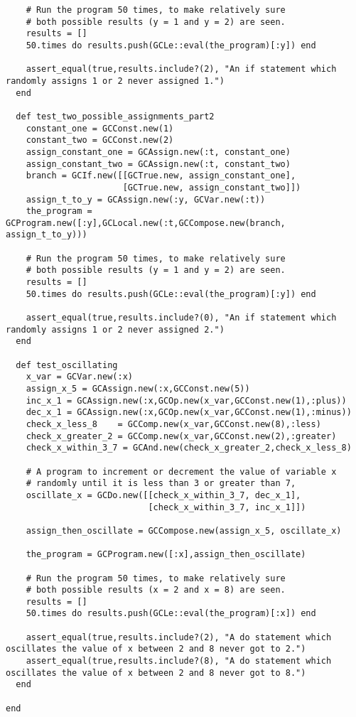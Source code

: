 \documentclass[11pt]{article}
\theoremstyle{definition}
\begin{document}
\begin{verbatim}
    # Run the program 50 times, to make relatively sure
    # both possible results (y = 1 and y = 2) are seen.
    results = []
    50.times do results.push(GCLe::eval(the_program)[:y]) end
  
    assert_equal(true,results.include?(2), "An if statement which randomly assigns 1 or 2 never assigned 1.")
  end

  def test_two_possible_assignments_part2
    constant_one = GCConst.new(1)
    constant_two = GCConst.new(2)
    assign_constant_one = GCAssign.new(:t, constant_one)
    assign_constant_two = GCAssign.new(:t, constant_two)
    branch = GCIf.new([[GCTrue.new, assign_constant_one],
                       [GCTrue.new, assign_constant_two]])
    assign_t_to_y = GCAssign.new(:y, GCVar.new(:t))
    the_program = GCProgram.new([:y],GCLocal.new(:t,GCCompose.new(branch, assign_t_to_y)))

    # Run the program 50 times, to make relatively sure
    # both possible results (y = 1 and y = 2) are seen.
    results = []
    50.times do results.push(GCLe::eval(the_program)[:y]) end
  
    assert_equal(true,results.include?(0), "An if statement which randomly assigns 1 or 2 never assigned 2.")
  end
  
  def test_oscillating
    x_var = GCVar.new(:x)
    assign_x_5 = GCAssign.new(:x,GCConst.new(5))
    inc_x_1 = GCAssign.new(:x,GCOp.new(x_var,GCConst.new(1),:plus))
    dec_x_1 = GCAssign.new(:x,GCOp.new(x_var,GCConst.new(1),:minus))
    check_x_less_8    = GCComp.new(x_var,GCConst.new(8),:less)
    check_x_greater_2 = GCComp.new(x_var,GCConst.new(2),:greater)
    check_x_within_3_7 = GCAnd.new(check_x_greater_2,check_x_less_8)
    
    # A program to increment or decrement the value of variable x
    # randomly until it is less than 3 or greater than 7,
    oscillate_x = GCDo.new([[check_x_within_3_7, dec_x_1],
                            [check_x_within_3_7, inc_x_1]])

    assign_then_oscillate = GCCompose.new(assign_x_5, oscillate_x)

    the_program = GCProgram.new([:x],assign_then_oscillate)

    # Run the program 50 times, to make relatively sure
    # both possible results (x = 2 and x = 8) are seen.
    results = []
    50.times do results.push(GCLe::eval(the_program)[:x]) end
  
    assert_equal(true,results.include?(2), "A do statement which oscillates the value of x between 2 and 8 never got to 2.")
    assert_equal(true,results.include?(8), "A do statement which oscillates the value of x between 2 and 8 never got to 8.")
  end

end
\end{verbatim}
\end{document}

